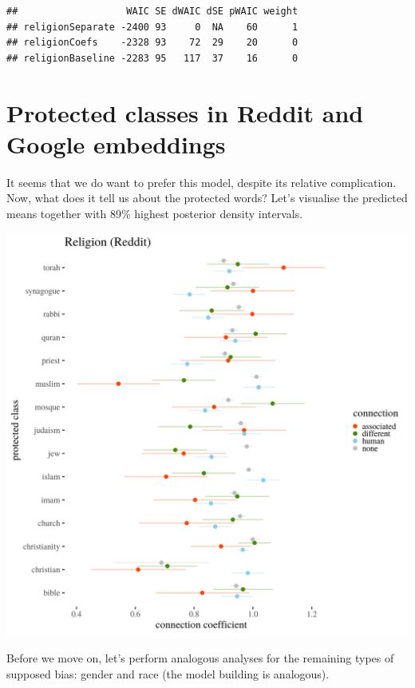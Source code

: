 \documentclass[12pt,]{book}
\begin{document}
\begin{verbatim}
##                   WAIC SE dWAIC dSE pWAIC weight
## religionSeparate -2400 93     0  NA    60      1
## religionCoefs    -2328 93    72  29    20      0
## religionBaseline -2283 95   117  37    16      0
\end{verbatim}

\normalsize

\section{Protected classes in Reddit and Google
embeddings}\label{protected-classes-in-reddit-and-google-embeddings}

It seems that we do want to prefer this model, despite its relative
complication. Now, what does it tell us about the protected words? Let's
visualise the predicted means together with 89\% highest posterior
density intervals.

\includegraphics[width=14cm]{../images/visReligionReddit.png}

Before we move on, let's perform analogous analyses for the remaining
types of supposed bias: gender and race (the model building is
analogous).
\end{document}
